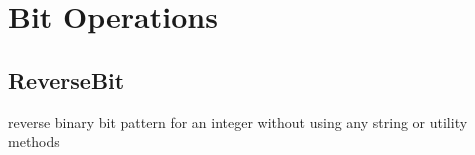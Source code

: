 \chapter{Bit Operations}

\section{ReverseBit}
reverse binary bit pattern for an integer without using any string or utility methods